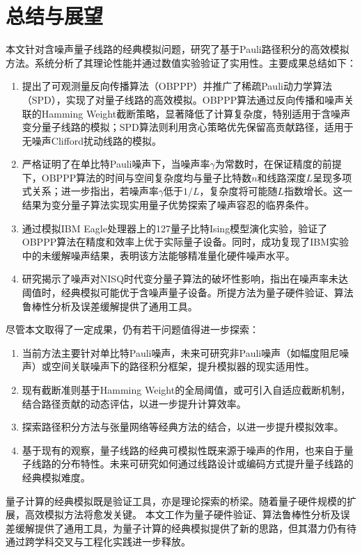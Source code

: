 \chapter{总结与展望}


本文针对含噪声量子线路的经典模拟问题，研究了基于Pauli路径积分的高效模拟方法。系统分析了其理论性能并通过数值实验验证了实用性。主要成果总结如下：
\begin{enumerate}
    \item 提出了可观测量反向传播算法（OBPPP）并推广了稀疏Pauli动力学算法（SPD），实现了对量子线路的高效模拟。OBPPP算法通过反向传播和噪声关联的Hamming Weight截断策略，显著降低了计算复杂度，特别适用于含噪声变分量子线路的模拟；SPD算法则利用贪心策略优先保留高贡献路径，适用于无噪声Clifford扰动线路的模拟。
    \item 严格证明了在单比特Pauli噪声下，当噪声率$\gamma$为常数时，在保证精度的前提下，OBPPP算法的时间与空间复杂度均与量子比特数$n$和线路深度$L$呈现多项式关系；进一步指出，若噪声率$\gamma$低于$1/L$，复杂度将可能随$L$指数增长。这一结果为变分量子算法实现实用量子优势探索了噪声容忍的临界条件。
    \item 通过模拟IBM Eagle处理器上的127量子比特Ising模型演化实验，验证了OBPPP算法在精度和效率上优于实际量子设备。同时，成功复现了IBM实验中的未缓解噪声结果，表明该方法能够精准量化硬件噪声水平。
    \item 研究揭示了噪声对NISQ时代变分量子算法的破坏性影响，指出在噪声率未达阈值时，经典模拟可能优于含噪声量子设备。所提方法为量子硬件验证、算法鲁棒性分析及误差缓解提供了通用工具。
\end{enumerate}

尽管本文取得了一定成果，仍有若干问题值得进一步探索：
\begin{enumerate}
    \item 当前方法主要针对单比特Pauli噪声，未来可研究非Pauli噪声（如幅度阻尼噪声）或空间关联噪声下的路径积分框架，提升模拟器的现实适用性。
    \item 现有截断准则基于Hamming Weight的全局阈值，或可引入自适应截断机制，结合路径贡献的动态评估，以进一步提升计算效率。
    \item 探索路径积分方法与张量网络等经典方法的结合，以进一步提升模拟效率。
    \item 基于现有的观察，量子线路的经典可模拟性既来源于噪声的作用，也来自于量子线路的分布特性。未来可研究如何通过线路设计或编码方式提升量子线路的经典模拟难度。
\end{enumerate}

量子计算的经典模拟既是验证工具，亦是理论探索的桥梁。随着量子硬件规模的扩展，高效模拟方法将愈发关键。
本文工作为量子硬件验证、算法鲁棒性分析及误差缓解提供了通用工具，为量子计算的经典模拟提供了新的思路，但其潜力仍有待通过跨学科交叉与工程化实践进一步释放。